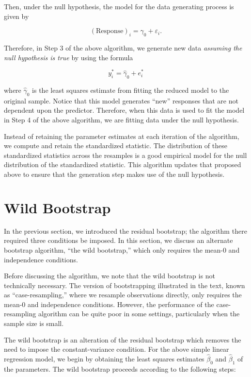 \documentclass[
  letterpaper,
  DIV=11,
  numbers=noendperiod]{scrreprt}
\theoremstyle{plain}
\theoremstyle{definition}
\theoremstyle{definition}
\theoremstyle{remark}
\begin{document}
Then, under the null hypothesis, the model for the data generating
process is given by

\[(\text{Response})_i = \gamma_0 + \varepsilon_i.\]

Therefore, in Step 3 of the above algorithm, we generate new data
\emph{assuming the null hypothesis is true} by using the formula

\[y_i^* = \widehat{\gamma}_0 + e_i^*\]

where \(\widehat{\gamma}_0\) is the least squares estimate from fitting
the reduced model to the original sample. Notice that this model
generates ``new'' responses that are not dependent upon the predictor.
Therefore, when this data is used to fit the model in Step 4 of the
above algorithm, we are fitting data under the null hypothesis.

Instead of retaining the parameter estimates at each iteration of the
algorithm, we compute and retain the standardized statistic. The
distribution of these standardized statistics across the resamples is a
good empirical model for the null distribution of the standardized
statistic. This algorithm updates that proposed above to ensure that the
generation step makes use of the null hypothesis.

\section{Wild Bootstrap}\label{wild-bootstrap}

In the previous section, we introduced the residual bootstrap; the
algorithm there required three conditions be imposed. In this section,
we discuss an alternate bootstrap algorithm, ``the wild bootstrap,''
which only requires the mean-0 and independence conditions.

Before discussing the algorithm, we note that the wild bootstrap is not
technically necessary. The version of bootstrapping illustrated in the
text, known as ``case-resampling,'' where we resample observations
directly, only requires the mean-0 and independence conditions. However,
the performance of the case-resampling algorithm can be quite poor in
some settings, particularly when the sample size is small.

The wild bootstrap is an alteration of the residual bootstrap which
removes the need to impose the constant-variance condition. For the
above simple linear regression model, we begin by obtaining the least
squares estimates \(\widehat{\beta}_0\) and \(\widehat{\beta}_1\) of the
parameters. The wild bootstrap proceeds according to the following
steps:
\end{document}
